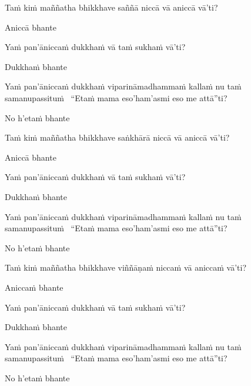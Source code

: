 \begin{pali-hang}
  Taṁ kiṁ maññatha bhikkhave saññā niccā vā aniccā vā'ti?
\end{pali-hang}
\begin{pali-hangtogether}
  Aniccā bhante
\end{pali-hangtogether}
\begin{pali-hangtogether}
  Yaṁ pan'āniccaṁ dukkhaṁ vā taṁ sukhaṁ vā'ti?
\end{pali-hangtogether}
\begin{pali-hangtogether}
  Dukkhaṁ bhante
\end{pali-hangtogether}
\begin{pali-hangtogether}
  Yaṁ pan'āniccaṁ dukkhaṁ viparināmadhammaṁ kallaṁ nu taṁ samanupassituṁ \breathmark\ ``Etaṁ mama eso'ham'asmi eso me attā''ti?
\end{pali-hangtogether}
\begin{pali-hangtogether}
  No h'etaṁ bhante
\end{pali-hangtogether}

\begin{pali-hang}
  Taṁ kiṁ maññatha bhikkhave saṅkhārā niccā vā aniccā vā'ti?
\end{pali-hang}
\begin{pali-hangtogether}
  Aniccā bhante
\end{pali-hangtogether}
\begin{pali-hangtogether}
  Yaṁ pan'āniccaṁ dukkhaṁ vā taṁ sukhaṁ vā'ti?
\end{pali-hangtogether}
\begin{pali-hangtogether}
  Dukkhaṁ bhante
\end{pali-hangtogether}
\begin{pali-hangtogether}
  Yaṁ pan'āniccaṁ dukkhaṁ viparināmadhammaṁ kallaṁ nu taṁ samanupassituṁ \breathmark\ ``Etaṁ mama eso'ham'asmi eso me attā''ti?
\end{pali-hangtogether}
\begin{pali-hangtogether}
  No h'etaṁ bhante
\end{pali-hangtogether}

\begin{pali-hang}
  Taṁ kiṁ maññatha bhikkhave viññāṇaṁ niccaṁ vā aniccaṁ vā'ti?
\end{pali-hang}
\begin{pali-hangtogether}
  Aniccaṁ bhante
\end{pali-hangtogether}
\begin{pali-hangtogether}
  Yaṁ pan'āniccaṁ dukkhaṁ vā taṁ sukhaṁ vā'ti?
\end{pali-hangtogether}
\begin{pali-hangtogether}
  Dukkhaṁ bhante
\end{pali-hangtogether}
\begin{pali-hangtogether}
  Yaṁ pan'āniccaṁ dukkhaṁ viparināmadhammaṁ kallaṁ nu taṁ samanupassituṁ \breathmark\ ``Etaṁ mama eso'ham'asmi eso me attā''ti?
\end{pali-hangtogether}
\begin{pali-hangtogether}
  No h'etaṁ bhante
\end{pali-hangtogether}

